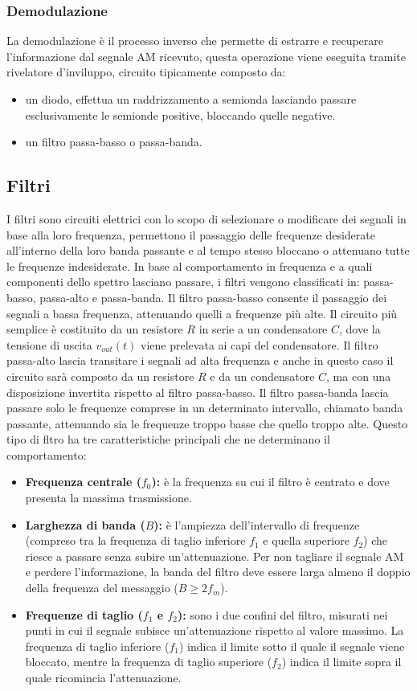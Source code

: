 \subsubsection{Demodulazione}
La demodulazione è il processo inverso che permette di estrarre e recuperare l'informazione dal segnale AM ricevuto, questa operazione viene eseguita tramite rivelatore d'inviluppo, circuito tipicamente composto da:
\begin{itemize}
  \item un diodo, effettua un raddrizzamento a semionda lasciando passare esclusivamente le semionde positive, bloccando quelle negative. 
  \item un filtro passa-basso o passa-banda.
\end{itemize}



\subsection{Filtri}
I filtri sono circuiti elettrici con lo scopo di selezionare o modificare dei segnali in base alla loro frequenza, permettono il passaggio delle frequenze desiderate all'interno della loro banda passante e al tempo stesso bloccano o attenuano tutte le frequenze indesiderate.
In base al comportamento in frequenza e a quali componenti dello spettro lasciano passare, i filtri vengono classificati in: passa-basso, passa-alto e passa-banda.
Il filtro passa-basso consente il passaggio dei segnali a bassa frequenza, attenuando quelli a frequenze più alte. Il circuito più semplice è costituito da un resistore $R$ in serie a un condensatore $C$, dove la tensione di uscita $v_{out}(t)$ viene prelevata ai capi del condensatore.
Il filtro passa-alto lascia transitare i segnali ad alta frequenza e anche in questo caso il circuito sarà composto da un resistore $R$ e da un condensatore $C$, ma con una disposizione invertita rispetto al filtro passa-basso.
Il filtro passa-banda lascia passare solo le frequenze comprese in un determinato intervallo, chiamato banda passante, attenuando sia le frequenze troppo basse che quello troppo alte. Questo tipo di fltro ha tre caratteristiche principali che ne determinano il comportamento:
\begin{itemize}
  \item \textbf{Frequenza centrale ($f_0$):} è la frequenza su cui il filtro è centrato e dove presenta la massima trasmissione.
  \item \textbf{Larghezza di banda ($B$):} è l'ampiezza dell'intervallo di frequenze (compreso tra la frequenza di taglio inferiore $f_1$ e quella superiore $f_2$) che riesce a passare senza subire un'attenuazione. Per non tagliare il segnale AM e perdere l'informazione, la banda del filtro deve essere larga almeno il doppio della frequenza del messaggio ($B \ge 2f_m$).
  \item \textbf{Frequenze di taglio ($f_1$ e $f_2$):} sono i due confini del filtro, misurati nei punti in cui il segnale subisce un'attenuazione rispetto al valore massimo. La frequenza di taglio inferiore ($f_1$) indica il limite sotto il quale il segnale viene bloccato, mentre la frequenza di taglio superiore ($f_2$) indica il limite sopra il quale ricomincia l'attenuazione.
\end{itemize}
